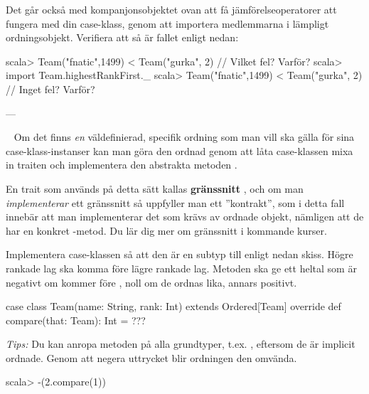 \Subtask Det går också med kompanjonsobjektet ovan att få jämförelseoperatorer att fungera med din case-klass, genom att importera medlemmarna i lämpligt ordningsobjekt. Verifiera att så är fallet enligt nedan:
\begin{REPL}
scala> Team("fnatic",1499) < Team("gurka", 2)  // Vilket fel? Varför?
scala> import Team.highestRankFirst._
scala> Team("fnatic",1499) < Team("gurka", 2)  // Inget fel? Varför?
\end{REPL}


\SOLUTION


\TaskSolved \what ---

\QUESTEND







\QUESTBEGIN

\Task  \what~  Om det finns \emph{en} väldefinierad, specifik ordning som man vill ska gälla för sina case-klass-instanser kan man göra den ordnad genom att låta case-klassen mixa in traiten  och implementera den abstrakta metoden .

\begin{Background}
En trait som används på detta sätt kallas \textbf{gränssnitt} , och om man \emph{implementerar} ett gränssnitt så uppfyller man ett ''kontrakt'', som i detta fall innebär att man implementerar det som krävs av ordnade objekt, nämligen att de har en konkret -metod. Du lär dig mer om gränssnitt i kommande kurser.
\end{Background}

\Subtask Implementera case-klassen  så att den är en subtyp till  enligt nedan skiss. Högre rankade lag ska komma före lägre rankade lag. Metoden  ska ge ett heltal som är negativt om  kommer före , noll om de ordnas lika, annars positivt.

\begin{Code}
case class Team(name: String, rank: Int) extends Ordered[Team]{
  override def compare(that: Team): Int = ???
}
\end{Code}
\emph{Tips:} Du kan anropa metoden  på alla grundtyper, t.ex. , eftersom de är implicit ordnade. Genom att negera uttrycket blir ordningen den omvända.
\begin{REPL}
scala> -(2.compare(1))
\end{REPL}

